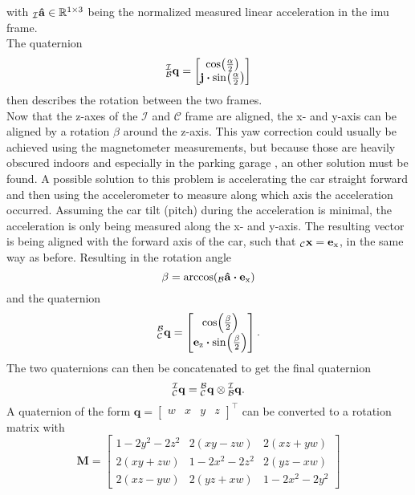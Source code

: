 with $\vincs{\vu{a}}{i} \in \mathbb{R}^{1\times3}$ being the normalized measured linear acceleration in the \gls{imu} frame.\\
The quaternion
\begin{equation}
    \qtf{i}{b} =
    \begin{bmatrix}
        \cos(\frac{\alpha}{2})\\
        \vb{j}\vdot\sin(\frac{\alpha}{2})
    \end{bmatrix}
\end{equation}
then describes the rotation between the two frames.\\
Now that the z-axes of the $\mathcal{I}$ and $\mathcal{C}$ frame are aligned, the x- and y-axis can be aligned by a rotation $\beta$ around the z-axis.
This yaw correction could usually be achieved using the magnetometer measurements, but because those are heavily obscured indoors and especially in the parking garage \cite{6418880}, an other solution must be found.
A possible solution to this problem is accelerating the car straight forward and then using the accelerometer to measure along which axis the acceleration occurred.
Assuming the car tilt (pitch) during the acceleration is minimal, the acceleration is only being measured along the x- and y-axis.
The resulting vector is being aligned with the forward axis of the car, such that $\vincs{x}{c} = \mathbf{e}_\mathrm{x}$, in the same way as before.
Resulting in the rotation angle
\begin{equation}
    \beta = \arccos(\vincs{\vu{a}}{b} \vdot \vb{e}_\mathrm{x})
\end{equation}
and the quaternion
\begin{equation}
    \qtf{b}{c} =
    \begin{bmatrix}
        \cos(\frac{\beta}{2})\\
        \vb{e}_\mathrm{z}\vdot\sin(\frac{\beta}{2})
    \end{bmatrix}.
\end{equation}
The two quaternions can then be concatenated to get the final quaternion
\begin{equation}
    \qtf{i}{c} = \qtf{b}{c} \otimes  \qtf{i}{b}.
\end{equation}
A quaternion of the form
$\mathbf{q} = \left[\begin{array}{llll} w & x & y & z \end{array}\right]^{\top}$
can be converted to a rotation matrix with
\begin{equation}
    \mathbf{M} =
    \left[
        \begin{array}{ccc}
            1-2 y^{2}-2 z^{2} & 2(x y-z w) & 2(x z+y w) \\
            2(x y+z w) & 1-2 x^{2}-2 z^{2} & 2(y z-x w) \\
            2(x z-y w) & 2(y z+x w) & 1-2 x^{2}-2 y^{2}
        \end{array}
        \right]
    \end{equation}
